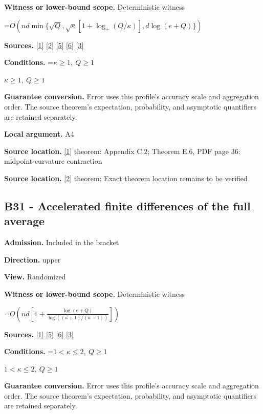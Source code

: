 \documentclass[10pt,a4paper]{article}
\newcommand{\AtlasMath}[1]{\par\begingroup\centering\setbox0=\hbox{$\displaystyle #1$}\ifdim\wd0>1.4\linewidth\typeout{ATLAS WIDE FORMULA: \the\wd0}\fi\ifdim\wd0>\linewidth\resizebox{\linewidth}{!}{\box0}\else\box0\fi\par\endgroup}
\newcommand{\AtlasInlineMath}[1]{\begingroup\setbox0=\hbox{$#1$}\ifdim\wd0>.4\linewidth\endgroup\AtlasMath{#1}\else\endgroup$#1$\fi}
\begin{document}
\textbf{Witness or lower-bound scope.} Deterministic witness

\AtlasMath{O(nd\min\{\sqrt Q,\sqrt\kappa[1+\log_+(Q/\kappa)],d\log(e+Q)\})}
\textbf{Sources.} \href{https://arxiv.org/html/2610.00345v1}{[1]} \href{https://arxiv.org/pdf/2609.18728v2}{[2]} \href{https://arxiv.org/html/2607.16558v2}{[5]} \href{https://www.mathnet.ru/php/archive.phtml?jrnid=mzm&option_lang=eng&paperid=1697&wshow=paper}{[6]} \href{https://arxiv.org/abs/2109.08858}{[3]}

\textbf{Conditions.} \AtlasInlineMath{\kappa\ge1,\ Q\ge1}

\textbf{Guarantee conversion.} Error uses this profile's accuracy scale and aggregation order. The source theorem's expectation, probability, and asymptotic quantifiers are retained separately.

\textbf{Local argument.} A4

\textbf{Source location.} \href{https://arxiv.org/html/2610.00345v1}{[1]} theorem: Appendix C.2; Theorem E.6, PDF page 36: midpoint-curvature contraction

\textbf{Source location.} \href{https://arxiv.org/pdf/2609.18728v2}{[2]} theorem: Exact theorem location remains to be verified

\subsection{B31 - Accelerated finite differences of the full average}
\textbf{Admission.} Included in the bracket

\textbf{Direction.} upper

\textbf{View.} Randomized

\textbf{Witness or lower-bound scope.} Deterministic witness

\AtlasMath{O\!\left(nd\left[1+\frac{\log(e+Q)}{\log((\kappa+1)/(\kappa-1))}\right]\right)}
\textbf{Sources.} \href{https://arxiv.org/html/2610.00345v1}{[1]} \href{https://arxiv.org/html/2607.16558v2}{[5]} \href{https://www.mathnet.ru/php/archive.phtml?jrnid=mzm&option_lang=eng&paperid=1697&wshow=paper}{[6]} \href{https://arxiv.org/abs/2109.08858}{[3]}

\textbf{Conditions.} \AtlasInlineMath{1<\kappa\le2,\ Q\ge1}

\textbf{Guarantee conversion.} Error uses this profile's accuracy scale and aggregation order. The source theorem's expectation, probability, and asymptotic quantifiers are retained separately.
\end{document}
